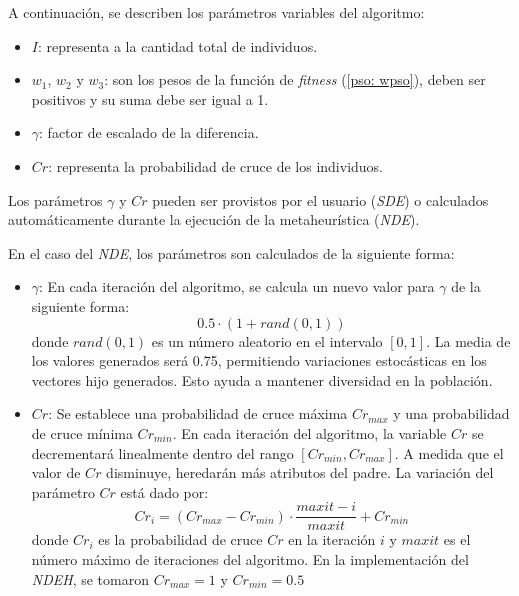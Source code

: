     A continuación, se describen los parámetros variables del algoritmo:
\begin{itemize}
    \item $I$: representa a la cantidad total de individuos.
    \item $w_1$, $w_2$ y $w_3$: son los pesos de la función de \emph{fitness}
(\ref{pso: wpso}), deben ser positivos y su suma debe ser igual a 1.
    \item $\gamma$: factor de escalado de la diferencia.
    \item $Cr$: representa la probabilidad de cruce  de los individuos.
\end{itemize}

    Los parámetros $\gamma$ y $Cr$ pueden ser provistos por el usuario (\emph{SDE})
o calculados automáticamente durante la ejecución de la metaheurística
(\emph{NDE}).

    En el caso del \emph{NDE}, los parámetros son calculados de la siguiente
forma\cite{SwAjAm2008}: 

\begin{itemize}

\item $\gamma$: En cada iteración del algoritmo, se calcula un nuevo valor para
$\gamma$ de la siguiente forma:
\begin{equation}\label{de: gamma}
    0.5 \cdot ( 1 + rand(0,1) )
\end{equation}
donde $rand(0,1)$ es un número aleatorio en el intervalo $[0, 1]$. La media de los
valores generados será 0.75, permitiendo variaciones estocásticas en los vectores
hijo generados. Esto ayuda a mantener diversidad en la población.

\item $Cr$: Se establece una probabilidad de cruce máxima $Cr_{max}$ y una probabilidad
de cruce mínima $Cr_{min}$. En cada iteración del algoritmo, la variable $Cr$ se
decrementará linealmente dentro del rango $[Cr_{min}, Cr_{max}]$. A medida que
el valor de $Cr$ disminuye, heredarán más atributos del padre. La variación del
parámetro $Cr$ está dado por:
\begin{equation}\label{de: cr}
    Cr_i = (Cr_{max}-Cr_{min}) \cdot \displaystyle\frac{maxit - i}{maxit} + Cr_{min}
\end{equation}
donde $Cr_i$ es la probabilidad de cruce $Cr$ en la iteración $i$ y $maxit$ es el
número máximo de iteraciones del algoritmo. En la implementación del \emph{NDEH},
se tomaron $Cr_{max} = 1$ y $Cr_{min} = 0.5$
\end{itemize}

